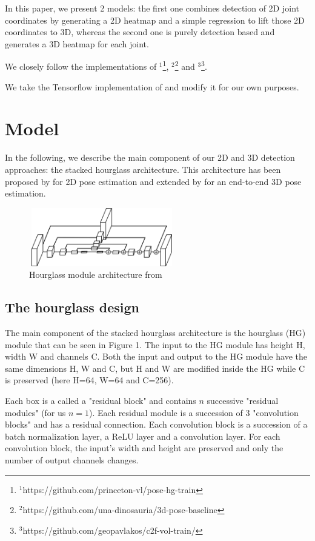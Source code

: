 \documentclass[sigconf]{acmart}
\begin{document}
In this paper, we present 2 models: the first one combines detection of 2D joint coordinates by generating a 2D heatmap and a simple regression to lift those 2D coordinates to 3D, whereas the second one is purely detection based and generates a 3D heatmap for each joint.

We closely follow the implementations of \cite{newell}$^1$\footnote{$^1$https://github.com/princeton-vl/pose-hg-train}, \cite{martinez}$^2$\footnote{$^2$https://github.com/una-dinosauria/3d-pose-baseline} and \cite{pavlakos}$^3$\footnote{$^3$https://github.com/geopavlakos/c2f-vol-train/}.

We take the Tensorflow implementation of \cite{martinez} and modify it for our own purposes.

\section{Model}
\quad In the following, we describe the main component of our 2D and 3D detection approaches: the stacked hourglass architecture. This architecture has been proposed by \cite{newell} for 2D pose estimation and extended by \cite{pavlakos} for an end-to-end 3D pose estimation.

\begin{figure}
\includegraphics[height=1in, width=2.5in]{img/single-hourglass.png}
\caption{Hourglass module architecture from \cite{newell}}
\end{figure}

\subsection{The hourglass design}
\quad The main component of the stacked hourglass architecture is the hourglass (HG) module that can be seen in Figure 1. The input to the HG module has height H, width W and channels C. Both the input and output to the HG module have the same dimensions H, W and C, but H and W are modified inside the HG while C is preserved (here H=64, W=64 and C=256).

Each box is a called a "residual block" and contains $n$ successive "residual modules" (for us $n=1$). Each residual module is a succession of 3 "convolution blocks" and has a residual connection. Each convolution block is a succession of a batch normalization layer, a ReLU layer and a convolution layer. For each convolution block, the input's width and height are preserved and only the number of output channels changes.
\end{document}
